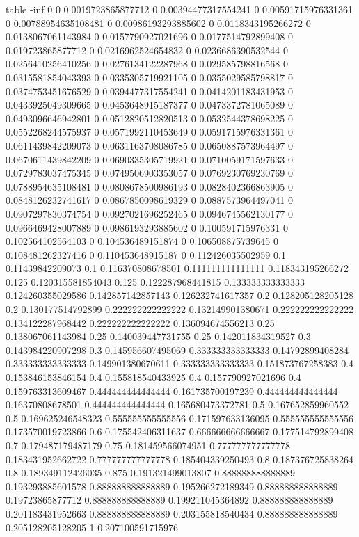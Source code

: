 table {%
-inf 0
0 0.0019723865877712
0 0.00394477317554241
0 0.00591715976331361
0 0.00788954635108481
0 0.00986193293885602
0 0.0118343195266272
0 0.0138067061143984
0 0.0157790927021696
0 0.0177514792899408
0 0.019723865877712
0 0.0216962524654832
0 0.0236686390532544
0 0.0256410256410256
0 0.0276134122287968
0 0.029585798816568
0 0.0315581854043393
0 0.0335305719921105
0 0.0355029585798817
0 0.0374753451676529
0 0.0394477317554241
0 0.0414201183431953
0 0.0433925049309665
0 0.0453648915187377
0 0.0473372781065089
0 0.0493096646942801
0 0.0512820512820513
0 0.0532544378698225
0 0.0552268244575937
0 0.0571992110453649
0 0.0591715976331361
0 0.0611439842209073
0 0.0631163708086785
0 0.0650887573964497
0 0.0670611439842209
0 0.0690335305719921
0 0.0710059171597633
0 0.0729783037475345
0 0.0749506903353057
0 0.0769230769230769
0 0.0788954635108481
0 0.0808678500986193
0 0.0828402366863905
0 0.0848126232741617
0 0.0867850098619329
0 0.0887573964497041
0 0.0907297830374754
0 0.0927021696252465
0 0.0946745562130177
0 0.0966469428007889
0 0.0986193293885602
0 0.100591715976331
0 0.102564102564103
0 0.104536489151874
0 0.106508875739645
0 0.108481262327416
0 0.110453648915187
0 0.112426035502959
0.1 0.11439842209073
0.1 0.116370808678501
0.111111111111111 0.118343195266272
0.125 0.120315581854043
0.125 0.122287968441815
0.133333333333333 0.124260355029586
0.142857142857143 0.126232741617357
0.2 0.128205128205128
0.2 0.130177514792899
0.222222222222222 0.132149901380671
0.222222222222222 0.134122287968442
0.222222222222222 0.136094674556213
0.25 0.138067061143984
0.25 0.140039447731755
0.25 0.142011834319527
0.3 0.143984220907298
0.3 0.145956607495069
0.333333333333333 0.14792899408284
0.333333333333333 0.149901380670611
0.333333333333333 0.151873767258383
0.4 0.153846153846154
0.4 0.155818540433925
0.4 0.157790927021696
0.4 0.159763313609467
0.444444444444444 0.161735700197239
0.444444444444444 0.16370808678501
0.444444444444444 0.165680473372781
0.5 0.167652859960552
0.5 0.169625246548323
0.555555555555556 0.171597633136095
0.555555555555556 0.173570019723866
0.6 0.175542406311637
0.666666666666667 0.177514792899408
0.7 0.179487179487179
0.75 0.181459566074951
0.777777777777778 0.183431952662722
0.777777777777778 0.185404339250493
0.8 0.187376725838264
0.8 0.189349112426035
0.875 0.191321499013807
0.888888888888889 0.193293885601578
0.888888888888889 0.195266272189349
0.888888888888889 0.19723865877712
0.888888888888889 0.199211045364892
0.888888888888889 0.201183431952663
0.888888888888889 0.203155818540434
0.888888888888889 0.205128205128205
1 0.207100591715976
}
